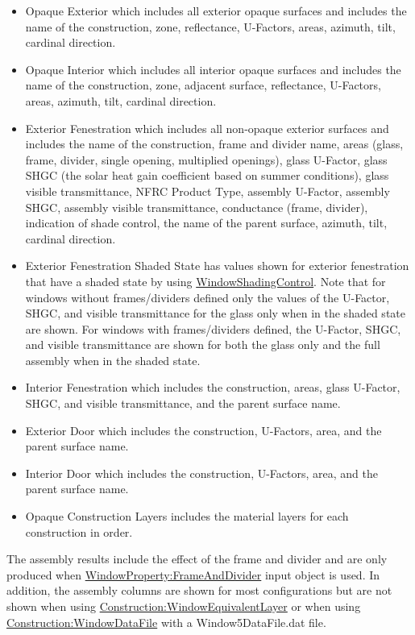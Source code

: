 \begin{itemize}
\item
  Opaque Exterior which includes all exterior opaque surfaces and includes the name of the construction, zone, reflectance, U-Factors, areas, azimuth, tilt, cardinal direction.
\item
  Opaque Interior which includes all interior opaque surfaces and includes the name of the construction, zone, adjacent surface, reflectance, U-Factors, areas, azimuth, tilt, cardinal direction.
\item
  Exterior Fenestration which includes all non-opaque exterior surfaces and includes the name of the construction, frame and divider name, areas (glass, frame, divider, single opening, multiplied openings), glass U-Factor, glass SHGC (the solar heat gain coefficient based on summer conditions), glass visible transmittance, NFRC Product Type, assembly U-Factor, assembly SHGC, assembly visible transmittance, conductance (frame, divider), indication of shade control, the name of the parent surface, azimuth, tilt, cardinal direction.
\item
  Exterior Fenestration Shaded State has values shown for exterior fenestration that have a shaded state by using \hyperref[windowpropertyshadingcontrol]{WindowShadingControl}.  Note that for windows without frames/dividers defined only the values of the U-Factor, SHGC, and visible transmittance for the glass only when in the shaded state are shown. For windows with frames/dividers defined, the U-Factor, SHGC, and visible transmittance are shown for both the glass only and the full assembly when in the shaded state.
\item
  Interior Fenestration which includes the construction, areas, glass U-Factor, SHGC, and visible transmittance, and the parent surface name.
\item
  Exterior Door which includes the construction, U-Factors, area, and the parent surface name.
\item
  Interior Door which includes the construction, U-Factors, area, and the parent surface name.
\item
  Opaque Construction Layers includes the material layers for each construction in order.

\end{itemize}

The assembly results include the effect of the frame and divider and are only produced when \hyperref[windowpropertyframeanddivider]{WindowProperty:FrameAndDivider} input object is used. In addition, the assembly columns are shown for most configurations but are not shown when using \hyperref[constructionwindowequivalentlayer]{Construction:WindowEquivalentLayer} or when using \hyperref[constructionwindowdatafile]{Construction:WindowDataFile} with a Window5DataFile.dat file.

